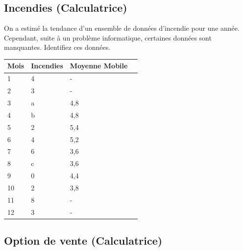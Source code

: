 \documentclass[11pt,english,francais]{article}
\begin{document}
\subsection{Incendies (Calculatrice)}

On a estimé la tendance d’un ensemble de données d’incendie pour une
année. Cependant, suite à un problème informatique, certaines données
sont manquantes. Identifiez ces données.\\

\begin{tabular}{|l|l|l|l|}
  \hline
  \multicolumn{1}{|l|}{Mois} & \multicolumn{1}{l|}{Incendies} & \multicolumn{1}{l|}{Moyenne Mobile} &  \\ \hline
  1 & 4 & \multicolumn{1}{l|}{-} &  \\ \hline
  2 & 3 & \multicolumn{1}{l|}{-} &  \\ \hline
  3 & \multicolumn{1}{l|}{a} & 4,8 &  \\ \hline
  4 & \multicolumn{1}{l|}{b} & 4,8 &  \\ \hline
  5 & 2 & 5,4 &  \\ \hline
  6 & 4 & 5,2 &  \\ \hline
  7 & 6 & 3,6 &  \\ \hline
  8 & \multicolumn{1}{l|}{c} & 3,6 &  \\ \hline
  9 & \multicolumn{1}{l|}{0} & 4,4 &  \\ \hline
  10 & 2 & 3,8 &  \\ \hline
  11 & 8 & \multicolumn{1}{l|}{-} &  \\ \hline
  12 & 3 & \multicolumn{1}{l|}{-} &  \\ \hline
\end{tabular}

\subsection{Option de vente (Calculatrice)}
\end{document}

